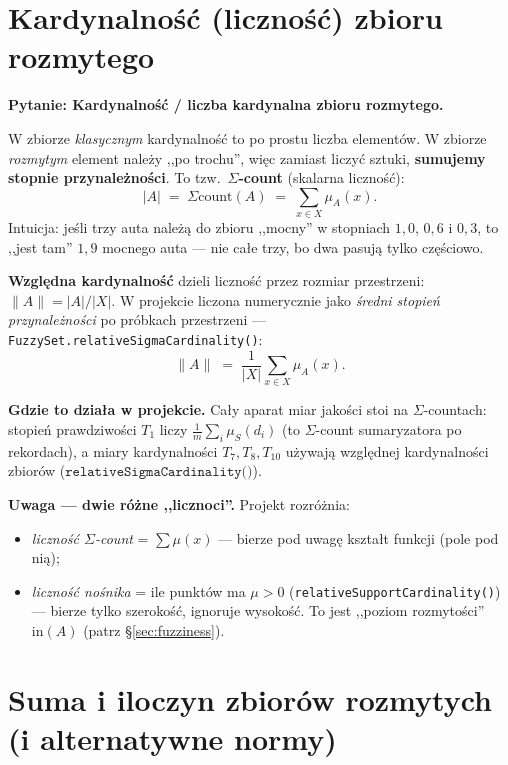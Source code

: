 \documentclass[11pt]{article}
\newcommand{\code}[1]{\texttt{#1}}
\newcommand{\inn}{\ensuremath{\mathrm{in}}}
\newcommand{\pyt}[1]{\medskip\noindent\textbf{\textcolor{mkbg}{Pytanie:} #1}\par\smallskip}
\begin{document}
\section{Kardynalność (liczność) zbioru rozmytego}

\pyt{Kardynalność / liczba kardynalna zbioru rozmytego.}

W zbiorze \emph{klasycznym} kardynalność to po prostu liczba elementów. W zbiorze
\emph{rozmytym} element należy ,,po trochu'', więc zamiast liczyć sztuki, \textbf{sumujemy
stopnie przynależności}. To tzw.\ \textbf{$\Sigma$-count} (skalarna liczność):
\[
  \big|A\big| \;=\; \Sigma\text{count}(A) \;=\; \sum_{x\in X} \mu_A(x).
\]
Intuicja: jeśli trzy auta należą do zbioru ,,mocny'' w stopniach $1{,}0$, $0{,}6$ i $0{,}3$,
to ,,jest tam'' $1{,}9$ mocnego auta --- nie całe trzy, bo dwa pasują tylko częściowo.

\medskip
\textbf{Względna kardynalność} dzieli liczność przez rozmiar przestrzeni:
\(
  \|A\| = |A| / |X|.
\)
W projekcie liczona numerycznie jako \emph{średni stopień przynależności} po próbkach
przestrzeni --- \code{FuzzySet.relativeSigmaCardinality()}:
\[
  \|A\| \;=\; \frac{1}{|X|}\sum_{x\in X}\mu_A(x).
\]

\medskip
\textbf{Gdzie to działa w projekcie.} Cały aparat miar jakości stoi na $\Sigma$-countach:
stopień prawdziwości $T_1$ liczy $\frac{1}{m}\sum_i \mu_S(d_i)$ (to $\Sigma$-count
sumaryzatora po rekordach), a miary kardynalności $T_7,T_8,T_{10}$ używają względnej
kardynalności zbiorów ($\code{relativeSigmaCardinality()}$).

\medskip
\textbf{Uwaga --- dwie różne ,,licznoci''.} Projekt rozróżnia:
\begin{itemize}[leftmargin=*]
\item \emph{liczność $\Sigma$-count} = $\sum \mu(x)$ --- bierze pod uwagę kszta\l t funkcji
  (pole pod nią);
\item \emph{liczność nośnika} = ile punktów ma $\mu>0$ (\code{relativeSupportCardinality()})
  --- bierze tylko szerokość, ignoruje wysokość. To jest ,,poziom rozmytości'' $\inn(A)$
  (patrz §\ref{sec:fuzziness}).
\end{itemize}

\section{Suma i iloczyn zbiorów rozmytych (i alternatywne normy)}
\label{sec:union-inter}
\end{document}
